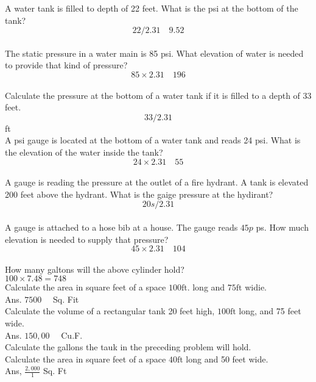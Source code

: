 A water tank is filled to depth of 22 feet. What is the psi at the bottom of the tank?\\
$$22 / 2.31 \quad 9.52$$\\

The static pressure in a water main is 85 psi. What elevation of water is needed to provide that kind of pressure?\\
$$85 \times 2.31 \quad 196$$\\

Calculate the pressure at the bottom of a water tank if it is filled to a depth of 33 feet.\\
$$33 / 2.31$$ft\\

A psi gauge is located at the bottom of a water tank and reads 24 psi. What is the elevation of the water inside the tank?\\
$$24 \times 2.31 \quad 55$$\\

A gauge is reading the pressure at the outlet of a fire hydrant. A tank is elevated 200 feet above the hydrant. What is the gaige pressure at the hydirant?\\
$$20 s / 2.31$$\\

A gauge is attached to a hose bib at a house. The gauge reads $45 p$ ps. How much elevation is needed to supply that pressure?\\
$$45 \times 2.31 \quad 104$$\\

How many galtons will the above cylinder hold?\\
$100 \times 7.48=748$\\

Calculate the area in square feet of a space $100 \mathrm{ft}$. long and $75 \mathrm{ft}$ widie.\\
Ans. $7500 \quad$ Sq. Fit\\

Calculate the volume of a rectangular tank 20 feet high, $100 \mathrm{ft}$ long, and 75 feet wide.\\
Ans. $150,00 \quad$ Cu.F.\\

Calculate the gallons the tauk in the preceding problem will hold.\\

Calculate the area in square feet of a space $40 \mathrm{ft}$ long and 50 feet wide.\\
Ans, $\frac{2,000}{1}$ Sq. Ft\\

